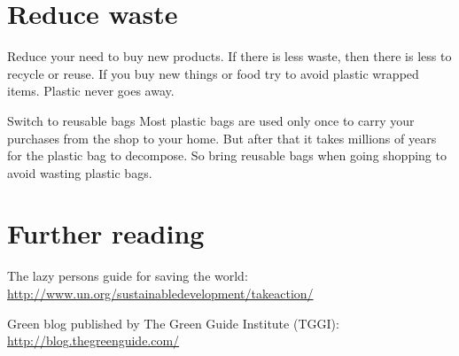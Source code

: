\section{Reduce waste}
	Reduce your need to buy new products. If there is less waste, then there is less to recycle or reuse.  
	If you buy new things or food try to avoid plastic wrapped items. Plastic never goes away. 

\begin{suggest}{Switch to reusable bags}
	Most plastic bags are used only once to carry your purchases from the shop to your home. But after that it takes millions of years for the plastic bag to decompose.
	So bring reusable bags when going shopping to avoid wasting plastic bags. 
\end{suggest}


\section{Further reading} 

\begin{suggest}{The lazy persons guide for saving the world:} 
\url{http://www.un.org/sustainabledevelopment/takeaction/}
\end{suggest}

\begin{suggest}{Green blog published by The Green Guide Institute (TGGI):}
\url{http://blog.thegreenguide.com/}
\end{suggest}
